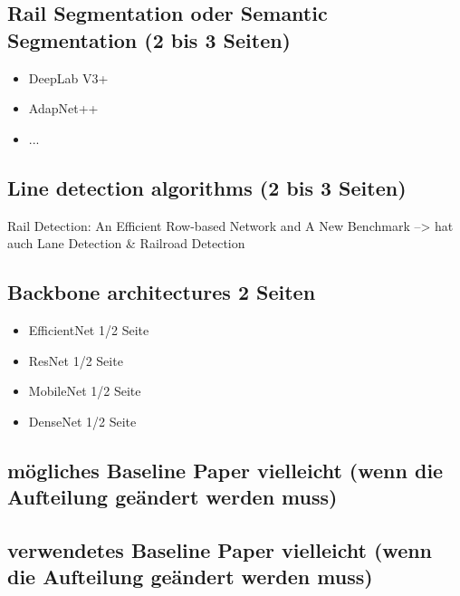 
\clearpage                                                       %



\subsection{Rail Segmentation oder Semantic Segmentation (2 bis 3 Seiten)}

\begin{itemize}
    \item DeepLab V3+
    \item AdapNet++
    \item ...
\end{itemize}

\subsection{Line detection algorithms (2 bis 3 Seiten)}

Rail Detection: An Efficient Row-based Network and A New Benchmark --> hat auch Lane Detection \& Railroad Detection

\subsection{Backbone architectures 2 Seiten}

\begin{itemize}
    \item EfficientNet 1/2 Seite
    \item ResNet 1/2 Seite
    \item MobileNet 1/2 Seite
    \item DenseNet 1/2 Seite
\end{itemize}

\subsection{mögliches Baseline Paper vielleicht (wenn die Aufteilung geändert werden muss)}

\subsection{verwendetes Baseline Paper vielleicht (wenn die Aufteilung geändert werden muss)}

